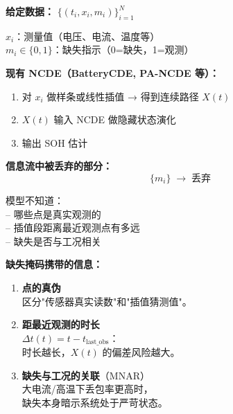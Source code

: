 \documentclass[11pt,a4paper,landscape]{ctexart}
\begin{document}
\begin{minipage}[t]{0.56\textwidth}
\normalsize
\textbf{给定数据：} \(\{(t_i, x_i, m_i)\}_{i=1}^N\)

\(x_i\)：测量值（电压、电流、温度等）\\
\(m_i \in \{0,1\}\)：缺失指示（0=缺失，1=观测）

\vspace{0.8em}
\textbf{现有 NCDE（BatteryCDE, PA-NCDE 等）：}
\begin{enumerate}[leftmargin=1.5em, itemsep=0.6em]
    \item 对 \(x_i\) 做样条或线性插值 → 得到连续路径 \(X(t)\)
    \item \(X(t)\) 输入 NCDE 做隐藏状态演化
    \item 输出 SOH 估计
\end{enumerate}

\vspace{0.6em}
\textbf{信息流中被丢弃的部分：}
\[
\{m_i\} \;\longrightarrow\; \boxed{\text{丢弃}}
\]

\vspace{0.4em}
模型不知道：\\
-- 哪些点是真实观测的\\
-- 插值段距离最近观测点有多远\\
-- 缺失是否与工况相关

\end{minipage}\hfill
\begin{minipage}[t]{0.42\textwidth}
\vspace{0em}
\normalsize
\textbf{缺失掩码携带的信息：}

\vspace{0.6em}
\begin{enumerate}[leftmargin=1.2em, itemsep=0.8em]
    \item \textbf{点的真伪}\\
    区分"传感器真实读数"和"插值猜测值"。

    \item \textbf{距最近观测的时长}\\
    \(\Delta t(t) = t - t_{\text{last\_obs}}\)： \\
    时长越长，\(X(t)\) 的偏差风险越大。

    \item \textbf{缺失与工况的关联}（MNAR）\\
    大电流/高温下丢包率更高时，\\
    缺失本身暗示系统处于严苛状态。
\end{enumerate}
\end{minipage}
\end{document}
